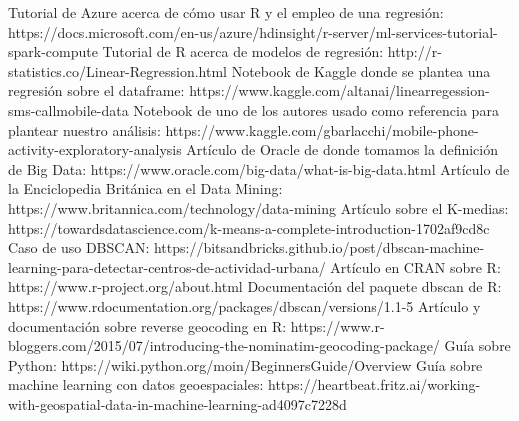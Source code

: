\documentclass[11pt, a4paper]{article} %
\begin{document}
\begin{thebibliography}{99}
 Tutorial de Azure acerca de cómo usar R y el empleo de una regresión: https://docs.microsoft.com/en-us/azure/hdinsight/r-server/ml-services-tutorial-spark-compute
 Tutorial de R acerca de modelos de regresión: http://r-statistics.co/Linear-Regression.html
 Notebook de Kaggle donde se plantea una regresión sobre el dataframe: https://www.kaggle.com/altanai/linearregession-sms-callmobile-data
 Notebook de uno de los autores usado como referencia para plantear nuestro análisis: https://www.kaggle.com/gbarlacchi/mobile-phone-activity-exploratory-analysis
 Artículo de Oracle de donde tomamos la definición de Big Data: https://www.oracle.com/big-data/what-is-big-data.html
 Artículo de la Enciclopedia Británica en el Data Mining: https://www.britannica.com/technology/data-mining
 Artículo sobre el K-medias: https://towardsdatascience.com/k-means-a-complete-introduction-1702af9cd8c
 Caso de uso DBSCAN: https://bitsandbricks.github.io/post/dbscan-machine-learning-para-detectar-centros-de-actividad-urbana/
 Artículo en CRAN sobre R: https://www.r-project.org/about.html
 Documentación del paquete dbscan de R: https://www.rdocumentation.org/packages/dbscan/versions/1.1-5
 Artículo y documentación sobre reverse geocoding en R: https://www.r-bloggers.com/2015/07/introducing-the-nominatim-geocoding-package/
 Guía sobre Python: https://wiki.python.org/moin/BeginnersGuide/Overview
 Guía sobre machine learning con datos geoespaciales: https://heartbeat.fritz.ai/working-with-geospatial-data-in-machine-learning-ad4097c7228d 
\end{thebibliography}
\newpage
\setlength{\originalVOffset}{\voffset}   
\setlength{\originalHOffset}{\hoffset}
\setlength{\voffset}{0cm}
\setlength{\hoffset}{0cm}

\setlength{\voffset}{\originalVOffset}
\setlength{\hoffset}{\originalHOffset}
\end{document}
